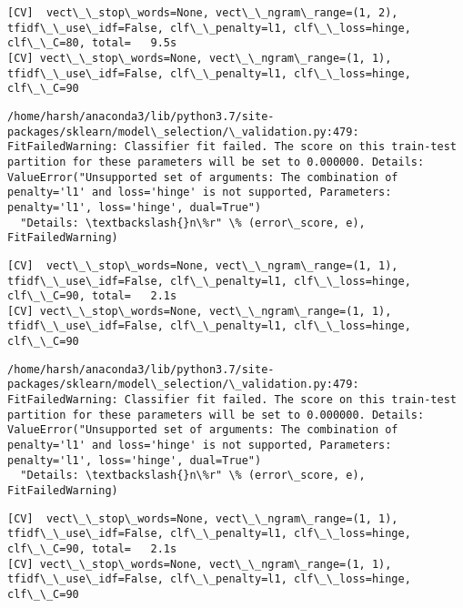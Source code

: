 \documentclass[11pt]{article}
\begin{document}
    \begin{Verbatim}[commandchars=\\\{\}]
[CV]  vect\_\_stop\_words=None, vect\_\_ngram\_range=(1, 2), tfidf\_\_use\_idf=False, clf\_\_penalty=l1, clf\_\_loss=hinge, clf\_\_C=80, total=   9.5s
[CV] vect\_\_stop\_words=None, vect\_\_ngram\_range=(1, 1), tfidf\_\_use\_idf=False, clf\_\_penalty=l1, clf\_\_loss=hinge, clf\_\_C=90 

    \end{Verbatim}

    \begin{Verbatim}[commandchars=\\\{\}]
/home/harsh/anaconda3/lib/python3.7/site-packages/sklearn/model\_selection/\_validation.py:479: FitFailedWarning: Classifier fit failed. The score on this train-test partition for these parameters will be set to 0.000000. Details: 
ValueError("Unsupported set of arguments: The combination of penalty='l1' and loss='hinge' is not supported, Parameters: penalty='l1', loss='hinge', dual=True")
  "Details: \textbackslash{}n\%r" \% (error\_score, e), FitFailedWarning)

    \end{Verbatim}

    \begin{Verbatim}[commandchars=\\\{\}]
[CV]  vect\_\_stop\_words=None, vect\_\_ngram\_range=(1, 1), tfidf\_\_use\_idf=False, clf\_\_penalty=l1, clf\_\_loss=hinge, clf\_\_C=90, total=   2.1s
[CV] vect\_\_stop\_words=None, vect\_\_ngram\_range=(1, 1), tfidf\_\_use\_idf=False, clf\_\_penalty=l1, clf\_\_loss=hinge, clf\_\_C=90 

    \end{Verbatim}

    \begin{Verbatim}[commandchars=\\\{\}]
/home/harsh/anaconda3/lib/python3.7/site-packages/sklearn/model\_selection/\_validation.py:479: FitFailedWarning: Classifier fit failed. The score on this train-test partition for these parameters will be set to 0.000000. Details: 
ValueError("Unsupported set of arguments: The combination of penalty='l1' and loss='hinge' is not supported, Parameters: penalty='l1', loss='hinge', dual=True")
  "Details: \textbackslash{}n\%r" \% (error\_score, e), FitFailedWarning)

    \end{Verbatim}

    \begin{Verbatim}[commandchars=\\\{\}]
[CV]  vect\_\_stop\_words=None, vect\_\_ngram\_range=(1, 1), tfidf\_\_use\_idf=False, clf\_\_penalty=l1, clf\_\_loss=hinge, clf\_\_C=90, total=   2.1s
[CV] vect\_\_stop\_words=None, vect\_\_ngram\_range=(1, 1), tfidf\_\_use\_idf=False, clf\_\_penalty=l1, clf\_\_loss=hinge, clf\_\_C=90 

    \end{Verbatim}
\end{document}
